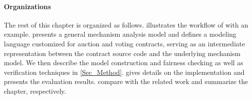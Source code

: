 
\paragraph{Organizations}
The rest of this chapter is organized as follows.
 illustrates the workflow of \faircon with an example.
 presents a general mechanism analysis model and defines a
modeling language customized for auction and voting contracts, serving as an intermediate
representation between the contract source code and the underlying mechanism model.
We then describe the model construction and fairness checking as well as verification techniques in
\cref{Sec_Method}.
 gives details on the implementation and presents the evaluation results.
 compare \faircon with the related work and summarize the chapter, respectively.



